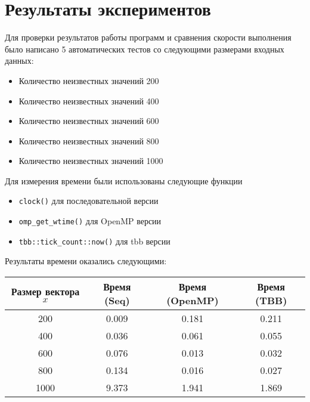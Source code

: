 \documentclass[14pt, russian]{extarticle}
\begin{document}
        \newpage

        \section{Результаты экспериментов}
            Для проверки результатов работы программ и сравнения скорости выполнения было написано 5 автоматических тестов со следующими размерами входных данных:
            \begin{itemize}
                \item Количество неизвестных значений 200
                \item Количество неизвестных значений 400
                \item Количество неизвестных значений 600
                \item Количество неизвестных значений 800
                \item Количество неизвестных значений 1000
            \end{itemize}
            Для измерения времени были использованы следующие функции
            \begin{itemize}
                \item \verb|clock()| для последовательной версии
                \item \verb|omp_get_wtime()| для OpenMP версии
                \item \verb|tbb::tick_count::now()| для tbb версии
            \end{itemize}
            Результаты времени оказались следующими:

        	\begin{table}[ht]
		\centering
		\begin{tabular}{| c | c | c | c |}
			\hline
			Размер вектора $x$ & Время (Seq) & Время (OpenMP) & Время (TBB) \\ [0.5ex]
			\hline
			200 & 0.009 & 0.181 & 0.211 \\
			\hline
			400 & 0.036 & 0.061 & 0.055 \\
			\hline
			600 & 0.076 & 0.013 & 0.032 \\
			\hline
			800 & 0.134 & 0.016 & 0.027 \\
   			\hline
			1000 & 9.373 & 1.941 & 1.869 \\
			\hline
		\end{tabular}
	\end{table}

        \newpage
\end{document}
